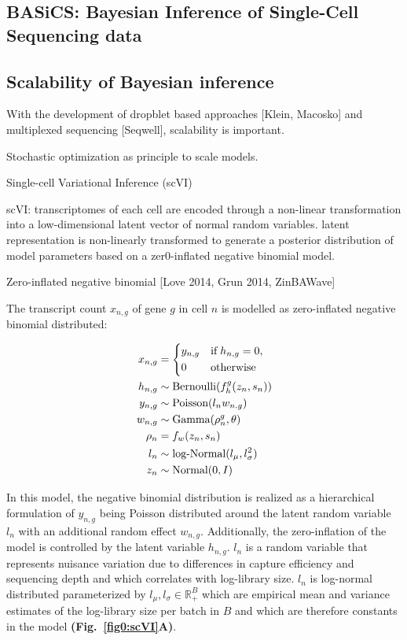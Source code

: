 \subsection{BASiCS: Bayesian Inference of Single-Cell Sequencing data} 

\subsection{Scalability of Bayesian inference}

With the development of dropblet based approaches [Klein, Macosko] and multiplexed sequencing [Seqwell], scalability is important.

Stochastic optimization as principle to scale models.

Single-cell Variational Inference (scVI) 

scVI: transcriptomes of each cell are encoded through a non-linear transformation into a low-dimensional latent vector of normal random variables. latent representation is non-linearly transformed to generate a posterior distribution of model parameters based on a zer0-inflated negative binomial model. 

Zero-inflated negative binomial [Love 2014, Grun 2014, ZinBAWave]

The transcript count $x_{n,g}$ of gene $g$ in cell $n$ is modelled as zero-inflated negative binomial distributed:

\begin{align*}
x_{n,g} & = 
 \left\lbrace
  \begin{aligned}
    & y_{n,g} && \textnormal{if} \; h_{n,g} = 0,  \\ 
    & 0 && \textnormal{otherwise}    	    
  \end{aligned}
\right.\\
h_{n,g} & \sim \textnormal{Bernoulli}(f_h^g(z_n,s_n))\\
y_{n,g} & \sim \textnormal{Poisson}(l_nw_{n.g})\\
w_{n,g} & \sim \textnormal{Gamma}(\rho^g_n, \theta)\\
\rho_n & = f_w(z_n,s_n)\\
l_n & \sim \textnormal{log-Normal}(l_{\mu},l^2_{\sigma})\\
z_n & \sim \textnormal{Normal}(0,I)
\end{align*}


In this model, the negative binomial distribution is realized as a hierarchical formulation of $y_{n,g}$ being Poisson distributed around the latent random variable $l_n$ with an additional random effect $w_{n,g}$. Additionally, the zero-inflation of the model is controlled by the latent variable $h_{n,g}$. $l_n$ is a random variable that represents nuisance variation due to differences in capture efficiency and sequencing depth and which correlates with log-library size. $l_n$ is log-normal distributed parameterized by $l_\mu,l_\sigma\in\mathbb{R}^B_+$ which are empirical mean and variance estimates of the log-library size per batch in $B$ and which are therefore constants in the model \textbf{(Fig.~\ref{fig0:scVI}A)}.\\

